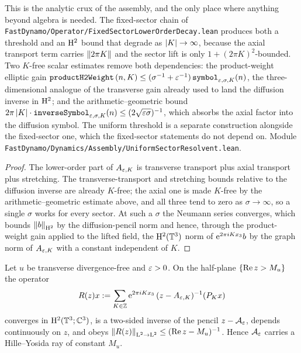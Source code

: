 This is the analytic crux of the assembly, and the only place where anything beyond algebra
is needed.  The fixed-sector chain of \texttt{FastDynamo/Operator/FixedSectorLowerOrderDecay.lean}
produces both a threshold and an $\mathrm{H}^2 $ bound that degrade as $\left\lvert K\right\rvert\to\infty $, because
the axial transport term carries $\left\|2\pi K\right\| $ and the sector lift is only
$1+(2\pi K)^2 $-bounded.  Two $K $-free scalar estimates remove both dependencies: the
product-weight elliptic gain
$\texttt{productH2Weight}\,(n,K)\leq(\sigma^{-1}+\varepsilon^{-1})\,\texttt{symbol}_{\varepsilon,\sigma,K}(n) $,
the three-dimensional analogue of the transverse gain already used to land the diffusion
inverse in $\mathrm{H}^2 $; and the arithmetic--geometric bound
$2\pi\left\lvert K\right\rvert\cdot\texttt{inverseSymbol}_{\varepsilon,\sigma,K}(n)\leq(2\sqrt{\varepsilon\sigma})^{-1} $,
which absorbs the axial factor into the diffusion symbol.  The uniform threshold is a separate construction alongside the fixed-sector one, which
the fixed-sector statements do not depend on.
Module \texttt{FastDynamo/Dynamics/Assembly/UniformSectorResolvent.lean}.

\begin{proof}
  \leanok
  The lower-order part of $A_{\varepsilon,K} $ is transverse transport plus axial transport plus
  stretching.  The transverse-transport and stretching bounds relative to the diffusion
  inverse are already $K $-free; the axial one is made $K $-free by the
  arithmetic--geometric estimate above, and all three tend to zero as $\sigma\to\infty $, so
  a single $\sigma $ works for every sector.  At such a $\sigma $ the Neumann series
  converges, which bounds $\left\|b\right\|_{\mathrm{H}^2} $ by the diffusion-pencil norm and hence, through
  the product-weight gain applied to the lifted field, the $\mathrm{H}^2(\mathbb{T}^3) $ norm of
  $\mathrm{e}^{2\pi iKx_3}b $ by the graph norm of $A_{\varepsilon,K} $ with a constant independent of $K $.
\end{proof}

\begin{proposition}
  \label{prop:dynamics:product-resolvent}
  \leanok
  Let $u $ be transverse divergence-free and $\varepsilon>0 $.  On the half-plane $\{\operatorname{Re} z>M_u\} $
  the operator
  \[
    R(z)x:=\sum_{K\in\mathbb{Z}}\mathrm{e}^{2\pi iKx_3}\,(z-A_{\varepsilon,K})^{-1}(P_Kx)
  \]
  converges in $\mathrm{H}^2(\mathbb{T}^3;\mathbb{C}^3) $, is a two-sided inverse of the pencil
  $z-\mathcal A_\varepsilon $, depends continuously on $z $, and obeys
  $\left\|R(z)\right\|_{\mathrm{L}^2\to\mathrm{L}^2}\leq(\operatorname{Re} z-M_u)^{-1} $.  Hence $\mathcal A_\varepsilon $ carries a
  Hille--Yosida ray of constant $M_u $.
\end{proposition}

